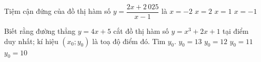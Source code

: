 
\begin{ex}%
	Tiệm cận đứng của đồ thị hàm số $y=\dfrac{2x+2\,025}{x-1}$ là
	\choice 
	{$x=-2$}
	{$x=2$}
	{\True $x=1$}
	{$x=-1$}
\end{ex}


\begin{ex}%
	Biết rằng đường thẳng $y=4x+5$ cắt đồ thị hàm số $y=x^3+2x+1$ tại điểm duy nhất; kí hiệu $(x_0;y_0)$ là toạ độ điểm đó. Tìm $y_0$.
	\choice 
	{\True $y_0=13$}
	{$y_0=12$}
	{$y_0=11$}
	{$y_0=10$}
\end{ex}



